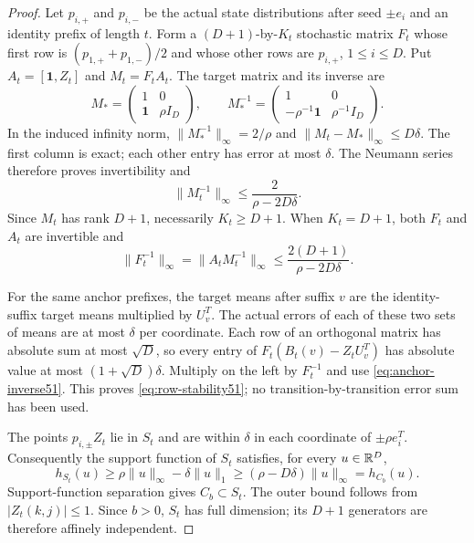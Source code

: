 \begin{proof}
Let $p_{i,+}$ and $p_{i,-}$ be the actual state distributions after
seed $\pm e_i$ and an identity prefix of length $t$. Form a
$(D+1)$-by-$K_t$ stochastic matrix $F_t$ whose first row is
$(p_{1,+}+p_{1,-})/2$ and whose other rows are $p_{i,+}$,
$1\le i\le D$. Put $A_t=[\mathbf1,Z_t]$ and $M_t=F_tA_t$.
The target matrix and its inverse are
\[
 M_* =\begin{pmatrix}1&0\\\mathbf1&\rho I_D\end{pmatrix},
 \qquad
 M_*^{-1}=\begin{pmatrix}1&0\\-\rho^{-1}\mathbf1&\rho^{-1}I_D\end{pmatrix}.
\]
In the induced infinity norm,
$\|M_*^{-1}\|_\infty=2/\rho$ and
$\|M_t-M_*\|_\infty\le D\delta$. The first column is exact;
each other entry has error at most $\delta$. The Neumann series
therefore proves invertibility and
\[
 \|M_t^{-1}\|_\infty\le\frac{2}{\rho-2D\delta}.
\]
Since $M_t$ has rank $D+1$, necessarily $K_t\ge D+1$.
When $K_t=D+1$, both $F_t$ and $A_t$ are invertible and
\begin{equation}\label{eq:anchor-inverse51}
 \|F_t^{-1}\|_\infty
 =\|A_tM_t^{-1}\|_\infty
 \le\frac{2(D+1)}{\rho-2D\delta}.
\end{equation}

For the same anchor prefixes, the target means after suffix $v$ are
the identity-suffix target means multiplied by $U_v^T$. The actual
errors of each of these two sets of means are at most $\delta$ per
coordinate. Each row of an orthogonal matrix has absolute sum at most
$\sqrt D$, so every entry of
$F_t(B_t(v)-Z_tU_v^T)$ has absolute value at most
$(1+\sqrt D)\delta$. Multiply on the left by $F_t^{-1}$ and use
\eqref{eq:anchor-inverse51}. This proves
\eqref{eq:row-stability51}; no transition-by-transition error sum has
been used.

The points $p_{i,\pm}Z_t$ lie in $S_t$ and are within $\delta$ in
each coordinate of $\pm\rho e_i^T$. Consequently the support
function of $S_t$ satisfies, for every $u\in\mathbb R^D$,
\[
 h_{S_t}(u)\ge\rho\|u\|_\infty-\delta\|u\|_1
             \ge(\rho-D\delta)\|u\|_\infty=h_{C_b}(u).
\]
Support-function separation gives $C_b\subset S_t$. The outer
bound follows from $|Z_t(k,j)|\le1$. Since $b>0$, $S_t$ has full
dimension; its $D+1$ generators are therefore affinely independent.
\end{proof}


